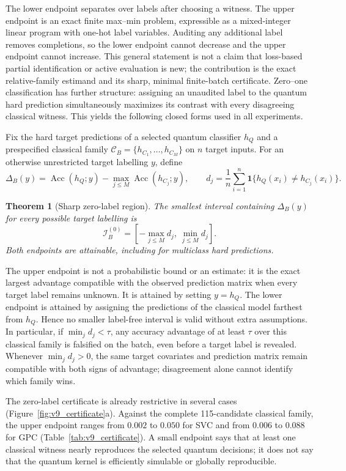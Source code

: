 \documentclass[referee,lineno,pdflatex,sn-nature]{sn-jnl}
\theoremstyle{thmstyleone}%
\newtheorem{theorem}{Theorem}%
\theoremstyle{thmstyletwo}%
\theoremstyle{thmstylethree}%
\begin{document}
The lower endpoint separates over labels after choosing a witness. The upper endpoint is an exact finite max--min problem, expressible as a mixed-integer linear program with one-hot label variables. Auditing any additional label removes completions, so the lower endpoint cannot decrease and the upper endpoint cannot increase. This general statement is not a claim that loss-based partial identification or active evaluation is new; the contribution is the exact relative-family estimand and its sharp, minimal finite-batch certificate. Zero--one classification has further structure: assigning an unaudited label to the quantum hard prediction simultaneously maximizes its contrast with every disagreeing classical witness. This yields the following closed forms used in all experiments.

Fix the hard target predictions of a selected quantum classifier $h_Q$ and a prespecified classical family $\mathcal C_B=\{h_{C_1},\ldots,h_{C_M}\}$ on $n$ target inputs. For an otherwise unrestricted target labelling $y$, define
\[
\Delta_B(y)=\operatorname{Acc}(h_Q;y)-
             \max_{j\leq M}\operatorname{Acc}(h_{C_j};y),
\qquad
d_j=\frac{1}{n}\sum_{i=1}^{n}
\mathbf 1\{h_Q(x_i)\neq h_{C_j}(x_i)\}.
\]

\begin{theorem}[Sharp zero-label region]
\label{thm:zero_label}
The smallest interval containing $\Delta_B(y)$ for every possible target labelling is
\[
\mathcal I_B^{(0)}
=\left[-\max_{j\leq M}d_j,\ \min_{j\leq M}d_j\right].
\]
Both endpoints are attainable, including for multiclass hard predictions.
\end{theorem}

The upper endpoint is not a probabilistic bound or an estimate: it is the exact largest advantage compatible with the observed prediction matrix when every target label remains unknown. It is attained by setting $y=h_Q$. The lower endpoint is attained by assigning the predictions of the classical model farthest from $h_Q$. Hence no smaller label-free interval is valid without extra assumptions. In particular, if $\min_j d_j<\tau$, any accuracy advantage of at least $\tau$ over this classical family is falsified on the batch, even before a target label is revealed. Whenever $\min_jd_j>0$, the same target covariates and prediction matrix remain compatible with both signs of advantage; disagreement alone cannot identify which family wins.

The zero-label certificate is already restrictive in several cases (Figure~\ref{fig:v9_certificate}a). Against the complete 115-candidate classical family, the upper endpoint ranges from $0.002$ to $0.050$ for SVC and from $0.006$ to $0.088$ for GPC (Table~\ref{tab:v9_certificate}). A small endpoint says that at least one classical witness nearly reproduces the selected quantum decisions; it does not say that the quantum kernel is efficiently simulable or globally reproducible.
\end{document}
